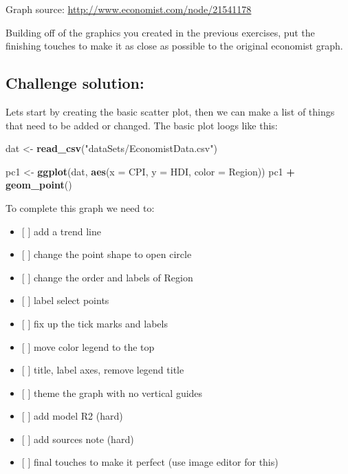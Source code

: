 \documentclass[]{book}
\newenvironment{Shaded}{\begin{snugshade}}{\end{snugshade}}
\newcommand{\KeywordTok}[1]{\textcolor[rgb]{0.13,0.29,0.53}{\textbf{#1}}}
\newcommand{\DataTypeTok}[1]{\textcolor[rgb]{0.13,0.29,0.53}{#1}}
\newcommand{\StringTok}[1]{\textcolor[rgb]{0.31,0.60,0.02}{#1}}
\newcommand{\OperatorTok}[1]{\textcolor[rgb]{0.81,0.36,0.00}{\textbf{#1}}}
\newcommand{\NormalTok}[1]{#1}
\providecommand{\tightlist}{%
  \setlength{\itemsep}{0pt}\setlength{\parskip}{0pt}}
\begin{document}
Graph source: \url{http://www.economist.com/node/21541178}

Building off of the graphics you created in the previous exercises, put
the finishing touches to make it as close as possible to the original
economist graph.

\subsection{Challenge solution:}\label{challenge-solution}

Lets start by creating the basic scatter plot, then we can make a list
of things that need to be added or changed. The basic plot loogs like
this:

\begin{Shaded}
\begin{Highlighting}[]
\NormalTok{dat <-}\StringTok{ }\KeywordTok{read_csv}\NormalTok{(}\StringTok{"dataSets/EconomistData.csv"}\NormalTok{)}

\NormalTok{pc1 <-}\StringTok{ }\KeywordTok{ggplot}\NormalTok{(dat, }\KeywordTok{aes}\NormalTok{(}\DataTypeTok{x =}\NormalTok{ CPI, }\DataTypeTok{y =}\NormalTok{ HDI, }\DataTypeTok{color =}\NormalTok{ Region))}
\NormalTok{pc1 }\OperatorTok{+}\StringTok{ }\KeywordTok{geom_point}\NormalTok{()}
\end{Highlighting}
\end{Shaded}

To complete this graph we need to:

\begin{itemize}
\tightlist
\item
  {[} {]} add a trend line
\item
  {[} {]} change the point shape to open circle
\item
  {[} {]} change the order and labels of Region
\item
  {[} {]} label select points
\item
  {[} {]} fix up the tick marks and labels
\item
  {[} {]} move color legend to the top
\item
  {[} {]} title, label axes, remove legend title
\item
  {[} {]} theme the graph with no vertical guides
\item
  {[} {]} add model R2 (hard)
\item
  {[} {]} add sources note (hard)
\item
  {[} {]} final touches to make it perfect (use image editor for this)
\end{itemize}
\end{document}
